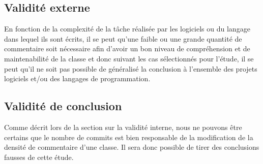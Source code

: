 \documentclass[11pt]{rapport-tp-qlm}
\begin{document}
\subsection{Validité externe}
En fonction de la complexité de la tâche réalisée par les logiciels ou du langage dans lequel ils sont écrits, il se peut qu'une faible ou une grande quantité de commentaire soit nécessaire afin d'avoir un bon niveau de compréhension et de maintenabilité de la classe et donc suivant les cas sélectionnés pour l'étude, il se peut qu'il ne soit pas possible de généralisé la conclusion à l'ensemble des projets logiciels et/ou des langages de programmation.
\subsection{Validité de conclusion}
Comme décrit lors de la section sur la validité interne, nous ne pouvons être certains que le nombre de commits est bien responsable de la modification de la densité de commentaire d'une classe. Il sera donc possible de tirer des conclusions fausses de cette étude.
\end{document}
